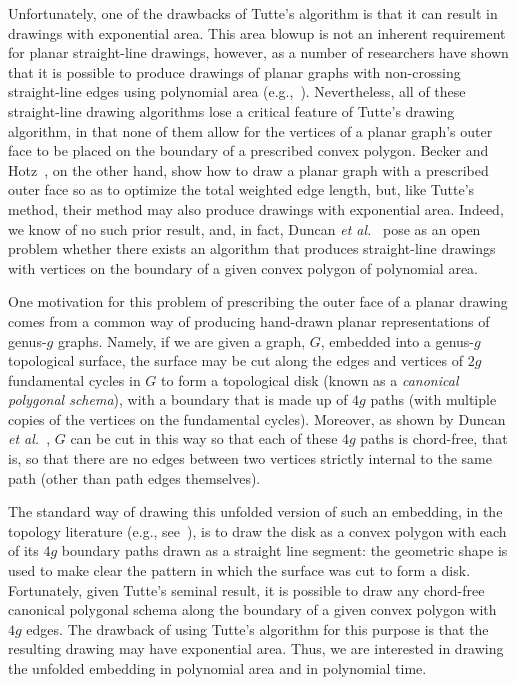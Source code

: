 \documentclass[11pt]{article}
\begin{document}
Unfortunately,
one of the drawbacks of Tutte's algorithm is that it
can result in drawings with exponential area.
This area blowup is not an inherent requirement for planar
straight-line drawings, however, as
a number of researchers have shown that it is possible to
produce drawings of planar graphs with non-crossing straight-line
edges using polynomial area
(e.g.,~\cite{ck-cgd3c-97,cp-ltadp-95,dpp,k-dpguc-96,s-epgg-90}).
Nevertheless, all of these straight-line drawing algorithms lose a
critical feature of Tutte's drawing algorithm, in that none of them
allow for the vertices of a planar graph's outer
face to be placed on the boundary of a prescribed
convex polygon.
Becker and Hotz~\cite{bh-olpgf-87}, on the other hand,
show how to draw a planar graph with
a prescribed outer face so as to optimize the total weighted edge
length, but, like Tutte's method,
their method may also produce drawings with exponential
area.
Indeed, we know of no such prior result, and, in fact,
Duncan {\it et al.}~\cite{duncan}
pose as an open problem whether there exists an algorithm
that produces straight-line drawings with vertices on the boundary
of a given convex polygon of polynomial area.

One motivation for this problem of prescribing the outer face of a planar drawing
comes from a common way of producing hand-drawn
planar representations of genus-$g$ graphs.
Namely, if we are given
a graph, $G$, embedded into a
genus-$g$ topological surface,
the surface may be cut along
the edges and vertices of $2g$ fundamental cycles in $G$ to form a topological disk (known as a \emph{canonical polygonal schema}), with a boundary that is made up
of $4g$ paths (with multiple copies of the vertices on the fundamental cycles).
Moreover, as shown by
Duncan {\it et al.}~\cite{duncan},
$G$ can be cut in this way so that
each of these $4g$ paths is chord-free, that is,
so that there are no edges
between two vertices strictly internal to the same path (other than
path edges themselves).

The standard way of drawing this unfolded version of
such an embedding, in the topology
literature (e.g., see~\cite{lpvv-ccpso-01}),
is to draw the disk as a convex polygon with each of its $4g$ boundary paths drawn as a straight line
segment: the geometric shape is used to make clear the pattern in which the surface was cut to form a disk.  Fortunately, given Tutte's seminal result, it is
possible to draw any chord-free canonical polygonal schema along the
boundary of a given convex polygon with $4g$ edges.
The drawback of using Tutte's algorithm for this purpose is that the resulting drawing may have exponential area.
Thus, we are interested in drawing the unfolded embedding in
polynomial area and in polynomial time.
\end{document}
